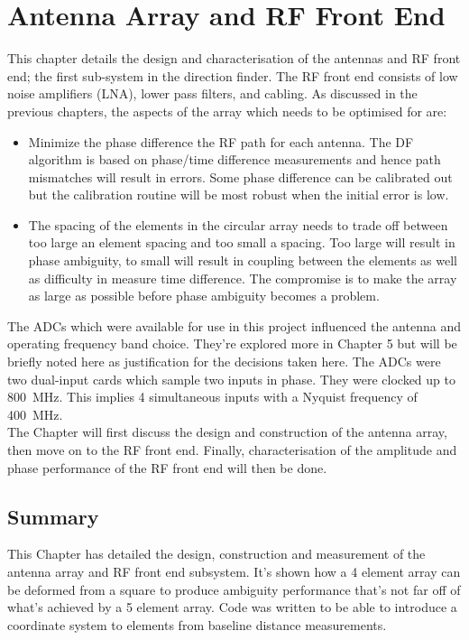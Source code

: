 \chapter{Antenna Array and RF Front End}
\label{ch:rf-front-end}
\graphicspath{{./img/rf-front-end/}}

This chapter details the design and characterisation of the antennas and RF front end; the first sub-system in the direction finder. The RF front end consists of low noise amplifiers (LNA), lower pass filters, and cabling. As discussed in the previous chapters, the aspects of the array which needs to be optimised for are:
\begin{itemize}
  \item Minimize the phase difference the RF path for each antenna. The DF algorithm is based on phase/time difference measurements and hence path mismatches will result in errors. Some phase difference can be calibrated out but the calibration routine will be most robust when the initial error is low.
  \item The spacing of the elements in the circular array needs to trade off between too large an element spacing and too small a spacing. Too large will result in phase ambiguity, to small will result in coupling between the elements as well as difficulty in measure time difference. The compromise is to make the array as large as possible before phase ambiguity becomes a problem.
\end{itemize}

The ADCs which were available for use in this project influenced the antenna and operating frequency band choice. They're explored more in Chapter 5 but will be briefly noted here as justification for the decisions taken here. The ADCs were two dual-input cards which sample two inputs in phase. They were clocked up to \SI{800}{\mega\hertz}. This implies 4 simultaneous inputs with a Nyquist frequency of \SI{400}{\mega\hertz}.\\

The Chapter will first discuss the design and construction of the antenna array, then move on to the RF front end. Finally, characterisation of the amplitude and phase performance of the RF front end will then be done. 





\section{Summary}
This Chapter has detailed the design, construction and measurement of the antenna array and RF front end subsystem. It's shown how a 4 element array can be deformed from a square to produce ambiguity performance that's not far off of what's achieved by a 5 element array. Code was written to be able to introduce a coordinate system to elements from baseline distance measurements. 

